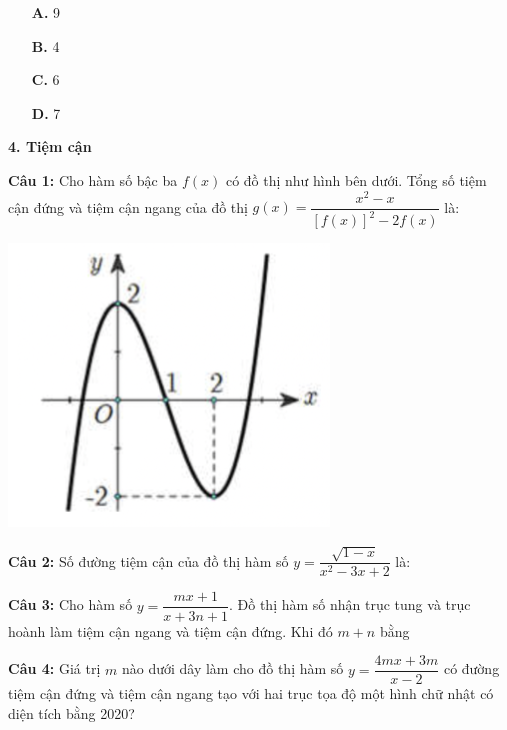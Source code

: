 \documentclass[12pt, a4paper]{article}
\begin{document}
			\begin{multicols}{4}
				\begin{enumerate}
					\item[\textbf{A.}] 9
					\item[\textbf{B.}] 4
					\item[\textbf{C.}] 6
					\item[\textbf{D.}] 7
				\end{enumerate}
			\end{multicols}
			
\pagebreak

		
	\textbf{4. Tiệm cận}
	
\vspace{-0.2cm}	
	
		\textbf{Câu 1: } Cho hàm số bậc ba $f(x)$ có đồ thị như hình bên dưới. Tổng số tiệm cận đứng và tiệm cận ngang của đồ thị $g(x)=\dfrac{ x^2-x }{ [f(x)]^2-2f(x)} $ là:
		
\vspace{-0.6cm}	

			\begin{center}
				\includegraphics[scale=0.8]{../images/tiemcan_cau1.png}
			\end{center}
			
\vspace{-0.6cm}			
			
		\textbf{Câu 2: } Số đường tiệm cận của đồ thị hàm số $y=\dfrac{ \sqrt{1-x }}{ x^2-3x+2 }$ là:
		
		\textbf{Câu 3: } Cho hàm số $y=\dfrac{ mx+1 }{ x+3n+1 }$. Đồ thị hàm số nhận trục tung và trục hoành làm tiệm cận ngang và tiệm cận đứng. Khi đó $m+n$ bằng
		
		\textbf{Câu 4: } Giá trị $m$ nào dưới dây làm cho đồ thị hàm số $y=\dfrac{ 4mx+3m }{ x-2 }$ có đường tiệm cận đứng và tiệm cận ngang tạo với hai trục tọa độ một hình chữ nhật có diện tích bằng 2020?
		
\end{document}
